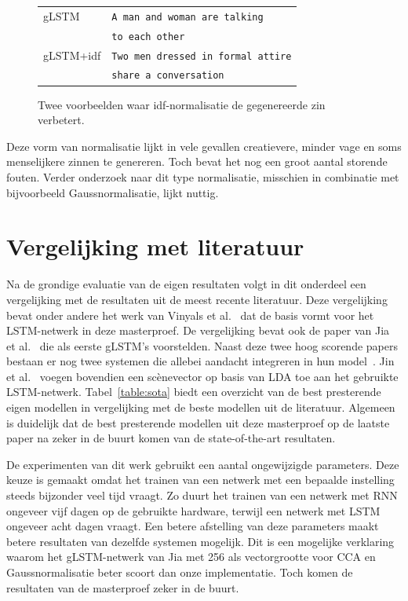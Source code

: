 \begin{figure}
\begin{minipage}[t]{.3\textwidth}
	\end{minipage}\hfill
	\begin{minipage}[t]{.7\textwidth}
		\vspace{0pt}
		\begin{tabular}{ll}
			gLSTM & \texttt{A man and woman are talking} \\ 
			~ & \texttt{to each other} \\
			gLSTM+idf & \texttt{Two men dressed in formal attire}\\
			~ & \texttt{share a conversation} \\
		\end{tabular}
	\end{minipage}
	\caption{Twee voorbeelden waar idf-normalisatie de gegenereerde zin verbetert.}
	\label{fig:betteridf}
\end{figure}

Deze vorm van normalisatie lijkt in vele gevallen creatievere, minder vage en soms menselijkere zinnen te genereren. Toch bevat het nog een groot aantal storende fouten. Verder onderzoek naar dit type normalisatie, misschien in combinatie met bijvoorbeeld Gaussnormalisatie, lijkt nuttig. 

\section{Vergelijking met literatuur} %
\label{sec:vergelijking_met_literatuur}
Na de grondige evaluatie van de eigen resultaten volgt in dit onderdeel een vergelijking met de resultaten uit de meest recente literatuur.
Deze vergelijking bevat onder andere het werk van Vinyals et al.~\cite{Google} dat de basis vormt voor het LSTM-netwerk in deze masterproef. 
De vergelijking bevat ook de paper van Jia et al.~\cite{Fernando2015} die als eerste gLSTM's voorstelden.
Naast deze twee hoog scorende papers bestaan er nog twee systemen die allebei aandacht integreren in hun model~\cite{Jin2015,Xu2015}.
Jin et al.~\cite{Jin2015} voegen bovendien een sc\`enevector op basis van LDA toe aan het gebruikte LSTM-netwerk.
Tabel~\ref{table:sota} biedt een overzicht van de best presterende eigen modellen in vergelijking met de beste modellen uit de literatuur.
Algemeen is duidelijk dat de best presterende modellen uit deze masterproef op de laatste paper na zeker in de buurt komen van de state-of-the-art resultaten.

De experimenten van dit werk gebruikt een aantal ongewijzigde parameters.
Deze keuze is gemaakt omdat het trainen van een netwerk met een bepaalde instelling steeds bijzonder veel tijd vraagt.
Zo duurt het trainen van een netwerk met RNN ongeveer vijf dagen op de gebruikte hardware, terwijl een netwerk met LSTM ongeveer acht dagen vraagt.
Een betere afstelling van deze parameters maakt betere resultaten van dezelfde systemen mogelijk.
Dit is een mogelijke verklaring waarom het gLSTM-netwerk van Jia met 256 als vectorgrootte voor CCA en Gaussnormalisatie beter scoort dan onze implementatie.
Toch komen de resultaten van de masterproef zeker in de buurt.

